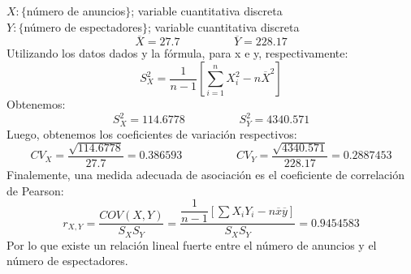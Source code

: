 \begin{solution}
$X:\{$n\'umero de anuncios$\}$; variable cuantitativa discreta\\$Y:\{$n\'umero de espectadores$\}$; variable cuantitativa discreta\\$$\overline{X}=27.7 \hspace{2cm} \overline{Y}=228.17$$Utilizando los datos dados y la f\'ormula, para x e y, respectivamente:$$S_{X}^{2}=\dfrac{1}{n-1}\left[ \sum_{i=1}^{n} X_{i}^{2}- n\overline{X}^2\right]$$Obtenemos:$$S_{X}^{2}=114.6778 \hspace{2cm} S_{Y}^{2}=4340.571$$Luego, obtenemos los coeficientes de variaci\'on respectivos:$$CV_{X}=\dfrac{\sqrt{114.6778}}{27.7}=0.386593\hspace{2cm}CV_{Y}=\dfrac{\sqrt{4340.571}}{228.17}=0.2887453$$Finalemente, una medida adecuada de asociaci\'on es el coeficiente de correlaci\'on de Pearson:$$r_{X,Y}=\dfrac{COV(X,Y)}{S_X S_Y}=\dfrac{\dfrac{1}{n-1}\left[ \sum X_i Y_i -n \overline{x}\overline{y}\right]}{S_X S_Y}=0.9454583$$Por lo que existe un relaci\'on lineal fuerte entre el n\'umero de anuncios y el n\'umero de espectadores.
\end{solution}
